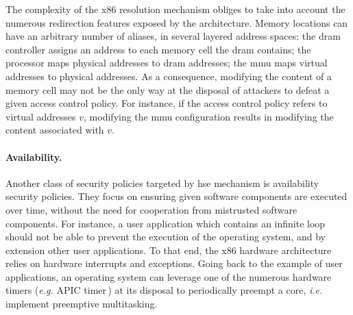 %
%

The complexity of the x86 \IO resolution mechanism obliges to take into account
the numerous redirection features exposed by the architecture.
%
Memory locations can have an arbitrary number
of aliases, in several layered address spaces: the \ac{dram} controller assigns
an address to each memory cell the \ac{dram} contains; the processor maps
physical addresses to \ac{dram} addresses; the \ac{mmu} maps virtual addresses
to physical addresses.
%
As a consequence, modifying the content of a memory cell may not be the only way
at the disposal of attackers to defeat a given access control policy.
%
For instance, if the access control policy refers to virtual addresses \( v \),
modifying the \ac{mmu} configuration results in modifying the content associated
with \( v \).

\paragraph{Availability.}
%
Another class of security policies targeted by \ac{hse} mechanism is
availability security policies.
%
They focus on ensuring given software components are executed over time, without
the need for cooperation from mistrusted software components.
%
For instance, a user application which contains an infinite loop should not be
able to prevent the execution of the operating system, and by extension other
user applications.
%
To that end, the x86 hardware architecture relies on hardware interrupts and
exceptions.
%
Going back to the example of user applications, an operating system can leverage
one of the numerous hardware timers (\emph{e.g.} APIC timer\,\cite[Volume 3,
Subsection 10.5.4]{intel2014manual}) at its disposal to periodically preempt a
core, \emph{i.e.} implement preemptive multitasking.

%
%
%

